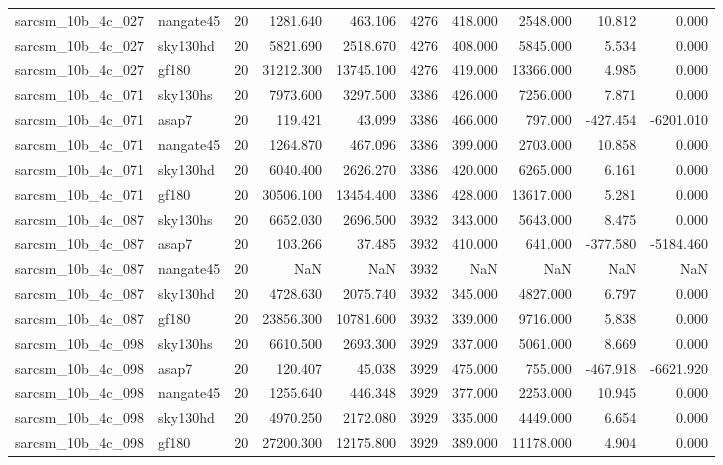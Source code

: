 \begin{tabular}{llrrrrrrrr}
sarcsm\_10b\_4c\_027 & nangate45 & 20 & 1281.640 & 463.106 & 4276 & 418.000 & 2548.000 & 10.812 & 0.000 \\
sarcsm\_10b\_4c\_027 & sky130hd & 20 & 5821.690 & 2518.670 & 4276 & 408.000 & 5845.000 & 5.534 & 0.000 \\
sarcsm\_10b\_4c\_027 & gf180 & 20 & 31212.300 & 13745.100 & 4276 & 419.000 & 13366.000 & 4.985 & 0.000 \\
sarcsm\_10b\_4c\_071 & sky130hs & 20 & 7973.600 & 3297.500 & 3386 & 426.000 & 7256.000 & 7.871 & 0.000 \\
sarcsm\_10b\_4c\_071 & asap7 & 20 & 119.421 & 43.099 & 3386 & 466.000 & 797.000 & -427.454 & -6201.010 \\
sarcsm\_10b\_4c\_071 & nangate45 & 20 & 1264.870 & 467.096 & 3386 & 399.000 & 2703.000 & 10.858 & 0.000 \\
sarcsm\_10b\_4c\_071 & sky130hd & 20 & 6040.400 & 2626.270 & 3386 & 420.000 & 6265.000 & 6.161 & 0.000 \\
sarcsm\_10b\_4c\_071 & gf180 & 20 & 30506.100 & 13454.400 & 3386 & 428.000 & 13617.000 & 5.281 & 0.000 \\
sarcsm\_10b\_4c\_087 & sky130hs & 20 & 6652.030 & 2696.500 & 3932 & 343.000 & 5643.000 & 8.475 & 0.000 \\
sarcsm\_10b\_4c\_087 & asap7 & 20 & 103.266 & 37.485 & 3932 & 410.000 & 641.000 & -377.580 & -5184.460 \\
sarcsm\_10b\_4c\_087 & nangate45 & 20 & NaN & NaN & 3932 & NaN & NaN & NaN & NaN \\
sarcsm\_10b\_4c\_087 & sky130hd & 20 & 4728.630 & 2075.740 & 3932 & 345.000 & 4827.000 & 6.797 & 0.000 \\
sarcsm\_10b\_4c\_087 & gf180 & 20 & 23856.300 & 10781.600 & 3932 & 339.000 & 9716.000 & 5.838 & 0.000 \\
sarcsm\_10b\_4c\_098 & sky130hs & 20 & 6610.500 & 2693.300 & 3929 & 337.000 & 5061.000 & 8.669 & 0.000 \\
sarcsm\_10b\_4c\_098 & asap7 & 20 & 120.407 & 45.038 & 3929 & 475.000 & 755.000 & -467.918 & -6621.920 \\
sarcsm\_10b\_4c\_098 & nangate45 & 20 & 1255.640 & 446.348 & 3929 & 377.000 & 2253.000 & 10.945 & 0.000 \\
sarcsm\_10b\_4c\_098 & sky130hd & 20 & 4970.250 & 2172.080 & 3929 & 335.000 & 4449.000 & 6.654 & 0.000 \\
sarcsm\_10b\_4c\_098 & gf180 & 20 & 27200.300 & 12175.800 & 3929 & 389.000 & 11178.000 & 4.904 & 0.000 \\

\end{tabular}
